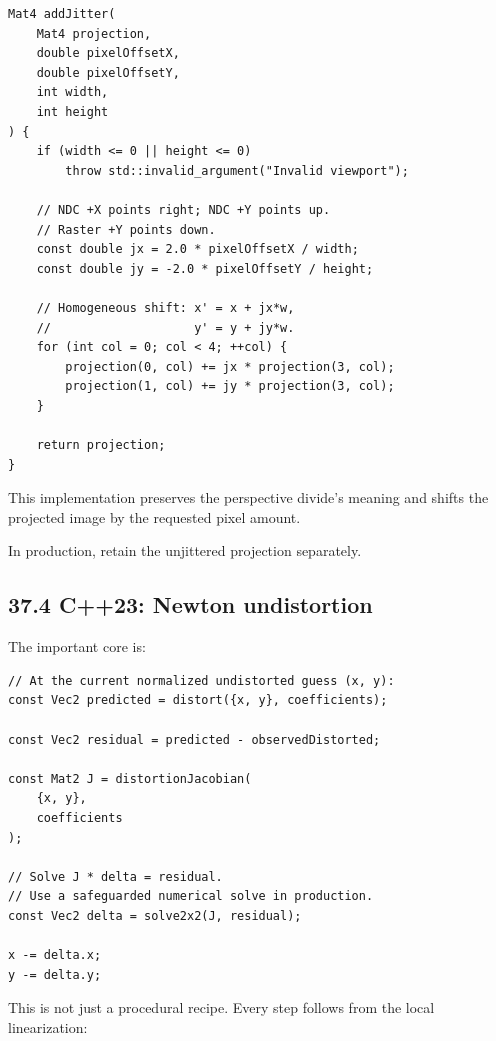 \hypertarget{02-foundations-ii-ch037-c23-stable-temporal-jitter}{}

\begin{verbatim}
Mat4 addJitter(
    Mat4 projection,
    double pixelOffsetX,
    double pixelOffsetY,
    int width,
    int height
) {
    if (width <= 0 || height <= 0)
        throw std::invalid_argument("Invalid viewport");

    // NDC +X points right; NDC +Y points up.
    // Raster +Y points down.
    const double jx = 2.0 * pixelOffsetX / width;
    const double jy = -2.0 * pixelOffsetY / height;

    // Homogeneous shift: x' = x + jx*w,
    //                    y' = y + jy*w.
    for (int col = 0; col < 4; ++col) {
        projection(0, col) += jx * projection(3, col);
        projection(1, col) += jy * projection(3, col);
    }

    return projection;
}
\end{verbatim}

This implementation preserves the perspective divide's meaning and shifts the projected image by the requested pixel amount.

In production, retain the unjittered projection separately.

\subsection{37.4 C++23: Newton undistortion}\label{02-foundations-ii-ch037-c23-newton-undistortion}

\hypertarget{02-foundations-ii-ch037-c23-newton-undistortion}{}

The important core is:

\begin{verbatim}
// At the current normalized undistorted guess (x, y):
const Vec2 predicted = distort({x, y}, coefficients);

const Vec2 residual = predicted - observedDistorted;

const Mat2 J = distortionJacobian(
    {x, y},
    coefficients
);

// Solve J * delta = residual.
// Use a safeguarded numerical solve in production.
const Vec2 delta = solve2x2(J, residual);

x -= delta.x;
y -= delta.y;
\end{verbatim}

This is not just a procedural recipe. Every step follows from the local linearization:

